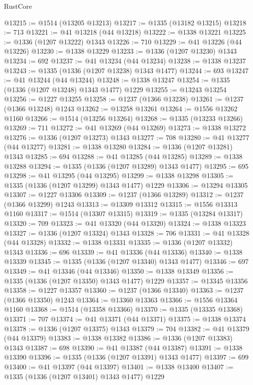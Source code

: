 \begin{lexlean}{RustCore}
\begin{coremodule}
@13215 := @1514 (@13205 @13213)
@13217 := @1335 (@13182 @13215)
@13218 := 713
@13221 := @41 @13218 (@44 @13218)
@13222 := @1338 @13221
@13225 := @1336 (@1207 @13222) @1343
@13226 := 710
@13229 := @41 @13226 (@44 @13226)
@13230 := @1338 @13229
@13233 := @1336 (@1207 @13230) @1343
@13234 := 692
@13237 := @41 @13234 (@44 @13234)
@13238 := @1338 @13237
@13243 := @1335 (@1336 (@1207 @13238) @1343 @1477)
@13244 := 693
@13247 := @41 @13244 (@44 @13244)
@13248 := @1338 @13247
@13254 := @1335 (@1336 (@1207 @13248) @1343 @1477) @1229
@13255 := @13243 @13254
@13256 := @1227 @13255
@13258 := @1237 (@1366 @13238)
@13261 := @1237 (@1366 @13248) @1243
@13262 := @13258 @13261
@13264 := @1556 @13262 @1160
@13266 := @1514 (@13256 @13264)
@13268 := @1335 (@13233 @13266)
@13269 := 711
@13272 := @41 @13269 (@44 @13269)
@13273 := @1338 @13272
@13276 := @1336 (@1207 @13273) @1343
@13277 := 708
@13280 := @41 @13277 (@44 @13277)
@13281 := @1338 @13280
@13284 := @1336 (@1207 @13281) @1343
@13285 := 694
@13288 := @41 @13285 (@44 @13285)
@13289 := @1338 @13288
@13294 := @1335 (@1336 (@1207 @13289) @1343 @1477)
@13295 := 695
@13298 := @41 @13295 (@44 @13295)
@13299 := @1338 @13298
@13305 := @1335 (@1336 (@1207 @13299) @1343 @1477) @1229
@13306 := @13294 @13305
@13307 := @1227 @13306
@13309 := @1237 (@1366 @13289)
@13312 := @1237 (@1366 @13299) @1243
@13313 := @13309 @13312
@13315 := @1556 @13313 @1160
@13317 := @1514 (@13307 @13315)
@13319 := @1335 (@13284 @13317)
@13320 := 709
@13323 := @41 @13320 (@44 @13320)
@13324 := @1338 @13323
@13327 := @1336 (@1207 @13324) @1343
@13328 := 706
@13331 := @41 @13328 (@44 @13328)
@13332 := @1338 @13331
@13335 := @1336 (@1207 @13332) @1343
@13336 := 696
@13339 := @41 @13336 (@44 @13336)
@13340 := @1338 @13339
@13345 := @1335 (@1336 (@1207 @13340) @1343 @1477)
@13346 := 697
@13349 := @41 @13346 (@44 @13346)
@13350 := @1338 @13349
@13356 := @1335 (@1336 (@1207 @13350) @1343 @1477) @1229
@13357 := @13345 @13356
@13358 := @1227 @13357
@13360 := @1237 (@1366 @13340)
@13363 := @1237 (@1366 @13350) @1243
@13364 := @13360 @13363
@13366 := @1556 @13364 @1160
@13368 := @1514 (@13358 @13366)
@13370 := @1335 (@13335 @13368)
@13371 := 707
@13374 := @41 @13371 (@44 @13371)
@13375 := @1338 @13374
@13378 := @1336 (@1207 @13375) @1343
@13379 := 704
@13382 := @41 @13379 (@44 @13379)
@13383 := @1338 @13382
@13386 := @1336 (@1207 @13383) @1343
@13387 := 698
@13390 := @41 @13387 (@44 @13387)
@13391 := @1338 @13390
@13396 := @1335 (@1336 (@1207 @13391) @1343 @1477)
@13397 := 699
@13400 := @41 @13397 (@44 @13397)
@13401 := @1338 @13400
@13407 := @1335 (@1336 (@1207 @13401) @1343 @1477) @1229

\end{coremodule}
\end{lexlean}
